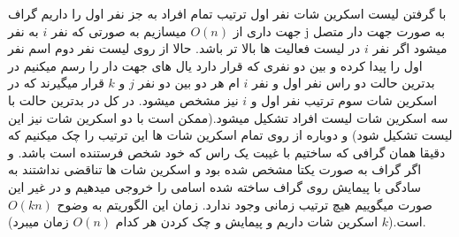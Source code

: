 \problem{}
با گرفتن لیست اسکرین شات نفر اول ترتیب تمام افراد به جز نفر اول را داریم
گراف جهت داری از $O(n)$ میسازیم به صورتی که
نفر $i$ به نفر j به صورت جهت دار متصل میشود
اگر نفر $i$ در لیست فعالیت ها بالا تر باشد.
حالا از روی لیست نفر دوم اسم نفر اول را پیدا کرده و بین دو نفری که قرار
دارد یال های جهت دار را رسم میکنیم 
در بدترین حالت دو راس نفر اول و نفر $i$ ام هر دو بین 
دو نفر $j$ و $k$ قرار میگیرند که در اسکرین شات سوم ترتیب نفر
اول و $i$ نیز مشخص میشود. 
در کل در بدترین حالت با سه اسکرین شات لیست افراد تشکیل میشود.(ممکن است با دو اسکرین شات نیز این لیست تشکیل شود)
و دوباره از روی تمام اسکرین شات ها این ترتیب را چک میکنیم که دقیقا همان گرافی که ساختیم با غیبت یک
راس که خود شخص فرستنده است باشد.
و اگر گراف به صورت یکتا مشخص شده بود و اسکرین شات ها تناقضی نداشتند
به سادگی با پیمایش روی گراف ساخته شده اسامی را خروجی میدهیم و در غیر این صورت
میگوییم هیچ ترتیب زمانی وجود ندارد.
زمان این الگوریتم به وضوح $O(kn)$ است.($k$ اسکرین شات داریم و پیمایش و چک کردن هر کدام $O(n)$ زمان میبرد).